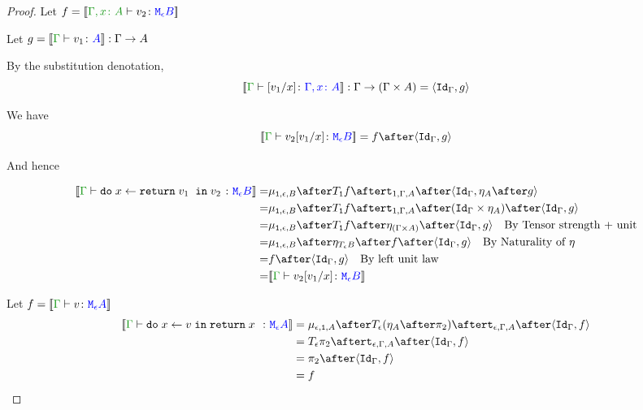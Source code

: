 \documentclass{report}
\begin{document}
\begin{framed}
\begin{proof}
        
        \case{\eqleftunit}
        Let $f = \deno{\typerelation{\gax}{v_2}{\meb}}$
        
        Let $g = \deno{\gtyperelation{v_1}{A}}: \G \rightarrow A$
        
        By the substitution denotation, $$\deno{\typerelation{\G}{\ssub{x}{v_1}}{\gax}}: \G \rightarrow (\G \times A) = \pr{\idg}{g}$$
        
        We have $$\deno{\gtyperelation{v_2\ssub{x}{v_1}}{\meb}} = f \after \pr{\idg}{g}$$
        
        And hence
        
        \begin{equation}
            \begin{split}
                \deno{\gtyperelation{\doin{x}{\return{v_1}}{v_2}}{\meb}} = &  \bind{\1}{\e}{B} \after \T{\1}{f} \after \tstrength{1}{\G}{A} \after \pr{\idg}{\point{A}\after g} \\
                = & \bind{\1}{\e}{B} \after \T{\1}{f} \after \tstrength{1}{\G}{A} \after (\idg\times \point{A}) \after \pr{\idg}{g} \\
                = & \bind{\1}{\e}{B} \after \T{\1}{f} \after \point{(\G \times A)} \after \pr{\idg}{g} \qt{By Tensor strength + unit}\\
                = & \bind{\1}{\e}{B}\after\point{\teb}\after f\after\pr{\idg}{g} \qt{By Naturality of $\point{}$}\\
                = & f\after\pr{\idg}{g} \qt{By left unit law}\\
                = & \deno{\gtyperelation{v_2\ssub{x}{v_1}}{\meb}}\\
            \end{split}
        \end{equation}
        
        
        
        
        \case{\eqrightunit}
        
        Let $f = \deno{\gtyperelation{v}{\mea}}$ 
            \begin{equation}
            \begin{split}
                \deno{\gtyperelation{\doin{x}{v}{\return{x}}}{\mea}}  & = \bind{\e}{\1}{A} \after \T{\e}{(\point{A} \after \pp)} \after \tstrength{\e}{\G}{A}\after \pr{\idg}{f} \\
                & = \T{\e}{\pp} \after \tstrength{\e}{\G}{A} \after \pr {\idg}{f} \\
                & = \pp \after \pr{\idg}{f}\\
                & = f
            \end{split}
        \end{equation}
        

\end{proof}
\end{framed}
\end{document}
